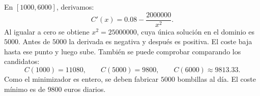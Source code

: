 En $[1000,6000]$, derivamos:
\[
C'(x)=0.08-\frac{2000000}{x^2}.
\]
Al igualar a cero se obtiene $x^2=25000000$, cuya única solución en
el dominio es $5000$. Antes de $5000$ la derivada es negativa y
después es positiva. El coste baja hasta ese punto y luego sube.
También se puede comprobar comparando los candidatos:
\[
C(1000)=11080,\qquad C(5000)=9800,\qquad C(6000)\approx9813.33.
\]
Como el minimizador es entero, se deben fabricar $\boxed{5000}$
bombillas al día. El coste mínimo es de $\boxed{9800}$ euros diarios.
